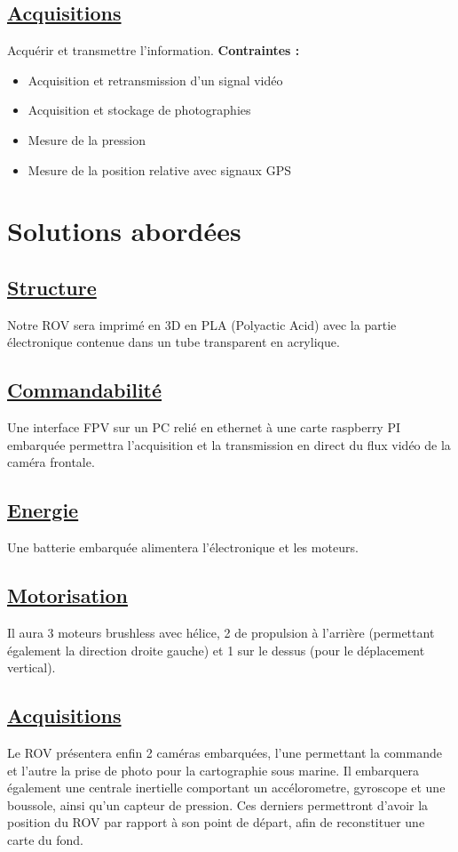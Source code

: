 \documentclass[a4paper,11pt]{report}
\begin{document}
						\subsection*{\underline{Acquisitions}}
								Acquérir et transmettre l'information. \newline
								\textbf{Contraintes :}
								\begin{itemize}
										\item Acquisition et retransmission d'un signal vidéo
										\item Acquisition et stockage de photographies
										\item Mesure de la pression
										\item Mesure de la position relative avec signaux GPS \newline
								\end{itemize}
			
			\section*{\Huge Solutions abordées}
			
						\subsection*{\underline{Structure}}
						Notre ROV sera imprimé en 3D en PLA (Polyactic Acid) avec la partie électronique contenue dans un tube transparent en acrylique.

						\subsection*{\underline{Commandabilité}}
						Une interface FPV sur un PC relié en ethernet à une carte raspberry PI embarquée permettra l'acquisition et la transmission en direct du flux vidéo de la caméra frontale.

						\subsection*{\underline{Energie}}
						Une batterie embarquée alimentera l'électronique et les moteurs. 

						\subsection*{\underline{Motorisation}}
						Il aura 3 moteurs brushless avec hélice, 2 de propulsion à l'arrière (permettant également la direction droite gauche) et 1 sur le dessus (pour le déplacement vertical).

						\subsection*{\underline{Acquisitions}}
						Le ROV présentera enfin 2 caméras embarquées, l'une permettant la commande et l'autre la prise de photo pour la cartographie sous marine. Il embarquera également une centrale inertielle comportant un accélorometre, gyroscope et une boussole, ainsi qu'un capteur de pression. Ces derniers permettront d'avoir la position du ROV par rapport à son point de départ, afin de reconstituer une carte du fond. 
								
\end{document}
